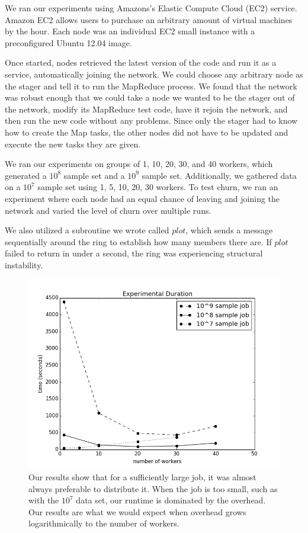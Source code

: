We ran our experiments using Amazons's Elastic Compute Cloud (EC2) service.  
Amazon EC2 allows users to purchase an arbitrary amount of virtual machines by the hour. 
Each node was an individual EC2 small instance with a preconfigured Ubuntu 12.04 image.  

Once started, nodes retrieved the latest version of the code and run it as a service, automatically joining the network.  
We could choose any arbitrary node as the stager and tell it to run the MapReduce process. 
We found that the network was robust enough that we could take a node we wanted to be the stager out of the network, modify its MapReduce test code, have it rejoin the network, and then run the new code without any problems. 
Since only the stager had to know how to create the Map tasks, the other nodes did not have to be updated and execute the new tasks they are given.

We ran our experiments on groups of 1, 10, 20, 30, and 40 workers, which generated a $10^{8}$ sample set and a $10^{9}$ sample set.
Additionally, we gathered data on a $10^{7}$ sample set using 1, 5, 10, 20, 30 workers.  
To test churn, we ran an experiment where each node had an equal chance of leaving and joining the network and varied the level of churn over multiple runs.  

We also utilized a subroutine we wrote called $plot$, which sends a message sequentially around the ring to establish how many members there are.  
If $plot$ failed to return in under a second, the ring was experiencing structural instability.

\begin{figure}
	\centering
	\includegraphics[width=0.5\linewidth]{figs/expTime}
	\caption{Our results show that for a sufficiently large job, it was almost always preferable to distribute it.  
		When the job is too small, such as with the $10^{7}$ data set, our runtime is dominated by the overhead.  
		Our results are what we would expect when overhead grows logarithmically to the number of workers.}
	\label{fig:expTime}
\end{figure}


